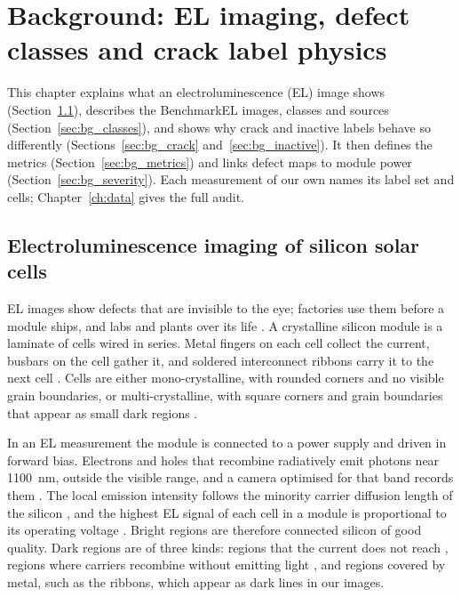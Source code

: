\chapter{Background: EL imaging, defect classes and crack label physics}\label{ch:background}

This chapter explains what an electroluminescence (EL) image shows (Section~\ref{sec:bg_el}), describes the BenchmarkEL
images, classes and sources (Section~\ref{sec:bg_classes}), and shows why crack and inactive labels behave so differently
(Sections~\ref{sec:bg_crack} and~\ref{sec:bg_inactive}). It then defines the metrics (Section~\ref{sec:bg_metrics}) and
links defect maps to module power (Section~\ref{sec:bg_severity}). Each measurement of our own names its label set and
cells; Chapter~\ref{ch:data} gives the full audit.

\section{Electroluminescence imaging of silicon solar cells}\label{sec:bg_el}

EL images show defects that are invisible to the eye; factories use them before a module ships, and labs and plants over
its life \citep{pratt2023benchmark}. A crystalline silicon module is a laminate of cells wired in series. Metal fingers on each cell collect the
current, busbars on the cell gather it, and soldered interconnect ribbons carry it to the next cell
\citep[Sec.~4.6]{kontges2014iea}. Cells are either mono-crystalline, with
rounded corners and no visible grain boundaries, or multi-crystalline, with square corners and grain boundaries that appear
as small dark regions \citep{pratt2023benchmark}.

In an EL measurement the module is connected to a power supply and driven in forward bias. Electrons and holes that
recombine radiatively emit photons near \SI{1100}{\nano\metre}, outside the visible range, and a camera optimised for
that band records them \citep{pratt2023benchmark}. The local emission intensity follows the minority
carrier diffusion length of the silicon \citep{fuyuki2005el}, and the highest EL signal of each cell in a module is
proportional to its operating voltage \citep{potthoff2010voltage}. Bright regions are therefore connected silicon of good
quality. Dark regions are
of three kinds: regions that the current does not reach \citep{pratt2025ictas}, regions where carriers recombine without
emitting light \citep{fuyuki2005el}, and regions covered by metal, such as the ribbons, which appear as dark lines in our
images.

